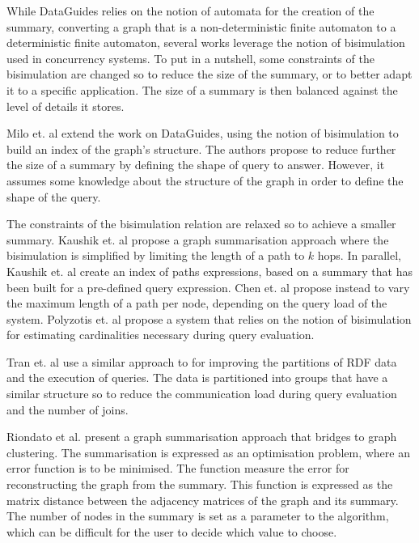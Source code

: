 While DataGuides relies on the notion of automata for the creation of the summary, converting a graph that is a non-deterministic finite automaton to a deterministic finite automaton, several works leverage the notion of bisimulation~\cite{park:1981:cai} used in concurrency systems. To put in a nutshell, some constraints of the bisimulation are changed so to reduce the size of the summary, or to better adapt it to a specific application. The size of a summary is then balanced against the level of details it stores.

Milo et. al \cite{Milo:1999:ISP:645503.656266} extend the work on DataGuides, using the notion of bisimulation to build an index of the graph's structure. The authors propose to reduce further the size of a summary by defining the shape of query to answer. However, it assumes some knowledge about the structure of the graph in order to define the shape of the query.

The constraints of the bisimulation relation are relaxed so to achieve a smaller summary. Kaushik et. al \cite{kaushik:de:2002} propose a graph summarisation approach where the bisimulation is simplified by limiting the length of a path to $k$ hops. In parallel, Kaushik et. al \cite{kaushik:2002:cib} create an index of paths expressions, based on a summary that has been built for a pre-defined query expression.
Chen et. al \cite{chen:2003:dia} propose instead to vary the maximum length of a path per node, depending on the query load of the system. Polyzotis et. al \cite{polyzotis:2006:xsx} propose a system that relies on the notion of bisimulation for estimating cardinalities necessary during query evaluation.

Tran et. al \cite{Tran:2012:kde} use a similar approach to \cite{kaushik:2002:cib} for improving the partitions of RDF data and the execution of queries. The data is partitioned into groups that have a similar structure so to reduce the communication load during query evaluation and the number of joins.

Riondato et al. \cite{riondato:2014:gsq} present a graph summarisation approach that bridges to graph clustering. The summarisation is expressed as an optimisation problem, where an error function is to be minimised. The function measure the error for reconstructing the graph from the summary. This function is expressed as the matrix distance between the adjacency matrices of the graph and its summary. The number of nodes in the summary is set as a parameter to the algorithm, which can be difficult for the user to decide which value to choose.\\

